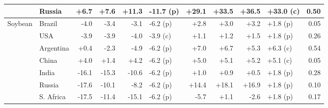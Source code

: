 \begin{tabular}{llrrrlrrrlr}
 & Russia & +6.7 & +7.6 & +11.3 & -11.7 (p) & +29.1 & +33.5 & +36.5 & +33.0 (c) & 0.50\\
\midrule
Soybean & Brazil & -4.0 & -3.4 & -3.1 & -6.2 (p) & +2.8 & +3.0 & +3.2 & +1.8 (p) & 0.05\\
 & USA & -3.9 & -3.9 & -4.0 & -3.9 (c) & +1.1 & +1.2 & +1.5 & +1.8 (p) & 0.26\\
 & Argentina & +0.4 & -2.3 & -4.9 & -6.2 (p) & +7.0 & +6.7 & +5.3 & +6.3 (c) & 0.54\\
 & China & +4.0 & +1.4 & +4.2 & -6.2 (p) & +5.0 & +5.1 & +5.2 & +5.1 (c) & 0.05\\
 & India & -16.1 & -15.3 & -10.6 & -6.2 (p) & +1.0 & +0.9 & +0.5 & +1.8 (p) & 0.28\\
 & Russia & -17.6 & -10.1 & -8.2 & -6.2 (p) & +14.4 & +18.1 & +16.9 & +1.8 (p) & 0.10\\
 & S. Africa & -17.5 & -11.4 & -15.1 & -6.2 (p) & -5.7 & +1.1 & -2.6 & +1.8 (p) & 0.17\\
\bottomrule
\end{tabular}
